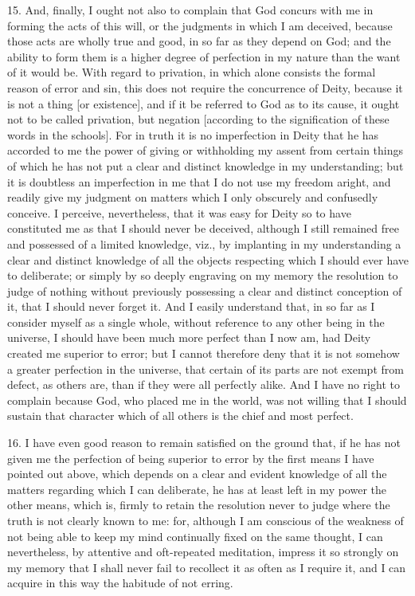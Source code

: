 15. And, finally, I ought not also to complain that God concurs with me in forming the acts of this will, or the judgments in which I am deceived, because those acts are wholly true and good, in so far as they depend on God; and the ability to form them is a higher degree of perfection in my nature than the want of it would be. With regard to privation, in which alone consists the formal reason of error and sin, this does not require the concurrence of Deity, because it is not a thing [or existence], and if it be referred to God as to its cause, it ought not to be called privation, but negation [according to the signification of these words in the schools]. For in truth it is no imperfection in Deity that he has accorded to me the power of giving or withholding my assent from certain things of which he has not put a clear and distinct knowledge in my understanding; but it is doubtless an imperfection in me that I do not use my freedom aright, and readily give my judgment on matters which I only obscurely and confusedly conceive. I perceive, nevertheless, that it was easy for Deity so to have constituted me as that I should never be deceived, although I still remained free and possessed of a limited knowledge, viz., by implanting in my understanding a clear and distinct knowledge of all the objects respecting which I should ever have to deliberate; or simply by so deeply engraving on my memory the resolution to judge of nothing without previously possessing a clear and distinct conception of it, that I should never forget it. And I easily understand that, in so far as I consider myself as a single whole, without reference to any other being in the universe, I should have been much more perfect than I now am, had Deity created me superior to error; but I cannot therefore deny that it is not somehow a greater perfection in the universe, that certain of its parts are not exempt from defect, as others are, than if they were all perfectly alike. And I have no right to complain because God, who placed me in the world, was not willing that I should sustain that character which of all others is the chief and most perfect.

16. I have even good reason to remain satisfied on the ground that, if he has not given me the perfection of being superior to error by the first means I have pointed out above, which depends on a clear and evident knowledge of all the matters regarding which I can deliberate, he has at least left in my power the other means, which is, firmly to retain the resolution never to judge where the truth is not clearly known to me: for, although I am conscious of the weakness of not being able to keep my mind continually fixed on the same thought, I can nevertheless, by attentive and oft-repeated meditation, impress it so strongly on my memory that I shall never fail to recollect it as often as I require it, and I can acquire in this way the habitude of not erring.

